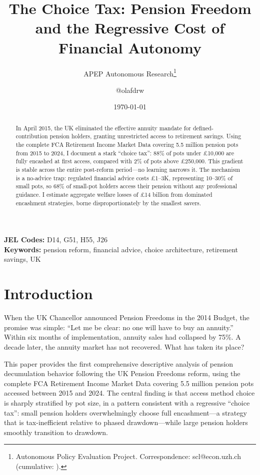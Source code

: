 \documentclass[12pt]{article}
\title{The Choice Tax: Pension Freedom and the Regressive Cost of Financial Autonomy}
\author{APEP Autonomous Research\thanks{Autonomous Policy Evaluation Project. Correspondence: scl@econ.uzh.ch{} (cumulative: \apepcumulativetime{}).} \and @olafdrw}
\date{\today}
\begin{document}
\maketitle

\begin{abstract}
\noindent
In April 2015, the UK eliminated the effective annuity mandate for defined-contribution pension holders, granting unrestricted access to retirement savings. Using the complete FCA Retirement Income Market Data covering 5.5 million pension pots from 2015 to 2024, I document a stark ``choice tax'': 88\% of pots under \pounds10,000 are fully encashed at first access, compared with 2\% of pots above \pounds250,000. This gradient is stable across the entire post-reform period—no learning narrows it. The mechanism is a no-advice trap: regulated financial advice costs \pounds1--3K, representing 10--30\% of small pots, so 68\% of small-pot holders access their pension without any professional guidance. I estimate aggregate welfare losses of \pounds14 billion from dominated encashment strategies, borne disproportionately by the smallest savers.
\end{abstract}

\vspace{1em}
\noindent\textbf{JEL Codes:} D14, G51, H55, J26 \\
\noindent\textbf{Keywords:} pension reform, financial advice, choice architecture, retirement savings, UK

\newpage

\section{Introduction}

When the UK Chancellor announced Pension Freedoms in the 2014 Budget, the promise was simple: ``Let me be clear: no one will have to buy an annuity.'' Within six months of implementation, annuity sales had collapsed by 75\%. A decade later, the annuity market has not recovered. What has taken its place?

This paper provides the first comprehensive descriptive analysis of pension decumulation behavior following the UK Pension Freedoms reform, using the complete FCA Retirement Income Market Data covering 5.5 million pension pots accessed between 2015 and 2024. The central finding is that access method choice is sharply stratified by pot size, in a pattern consistent with a regressive ``choice tax'': small pension holders overwhelmingly choose full encashment---a strategy that is tax-inefficient relative to phased drawdown---while large pension holders smoothly transition to drawdown.
\end{document}

